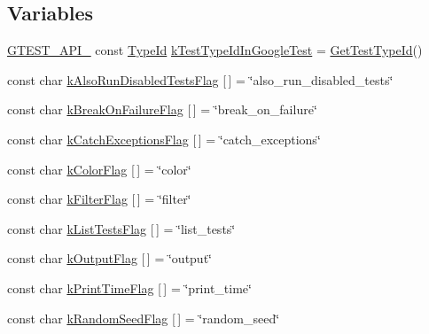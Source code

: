 \subsection*{\-Variables}
\begin{DoxyCompactItemize}
\item 
\hyperlink{gtest-port_8h_aa73be6f0ba4a7456180a94904ce17790}{\-G\-T\-E\-S\-T\-\_\-\-A\-P\-I\-\_\-} const \hyperlink{namespacetesting_1_1internal_ac8e91f0c6a06c0361dc3152ddfeb2342}{\-Type\-Id} \hyperlink{namespacetesting_1_1internal_a3117ae1f8725f2828385dd7d9fb91ffc}{k\-Test\-Type\-Id\-In\-Google\-Test} = \hyperlink{namespacetesting_1_1internal_a3e7f71e983859c908bae4ec8d593ff58}{\-Get\-Test\-Type\-Id}()
\item 
const char \hyperlink{namespacetesting_1_1internal_a6ede7eecc363c348aba14d8b41f73b8f}{k\-Also\-Run\-Disabled\-Tests\-Flag} \mbox{[}$\,$\mbox{]} = \char`\"{}also\-\_\-run\-\_\-disabled\-\_\-tests\char`\"{}
\item 
const char \hyperlink{namespacetesting_1_1internal_a7428ba6fee0b44acbd1d308cd7804beb}{k\-Break\-On\-Failure\-Flag} \mbox{[}$\,$\mbox{]} = \char`\"{}break\-\_\-on\-\_\-failure\char`\"{}
\item 
const char \hyperlink{namespacetesting_1_1internal_a1a9e7362cafa5838b6cae9fb1a861ada}{k\-Catch\-Exceptions\-Flag} \mbox{[}$\,$\mbox{]} = \char`\"{}catch\-\_\-exceptions\char`\"{}
\item 
const char \hyperlink{namespacetesting_1_1internal_a0794d62b77bae59a9082ba4b7ea1fc90}{k\-Color\-Flag} \mbox{[}$\,$\mbox{]} = \char`\"{}color\char`\"{}
\item 
const char \hyperlink{namespacetesting_1_1internal_ae8ede5b14ce6f96fff7e0aabe86aceef}{k\-Filter\-Flag} \mbox{[}$\,$\mbox{]} = \char`\"{}filter\char`\"{}
\item 
const char \hyperlink{namespacetesting_1_1internal_ae3a6eeb3de16a5f69f3bc0568c8e9da0}{k\-List\-Tests\-Flag} \mbox{[}$\,$\mbox{]} = \char`\"{}list\-\_\-tests\char`\"{}
\item 
const char \hyperlink{namespacetesting_1_1internal_add148191334fbc797c9a2cc2fff82670}{k\-Output\-Flag} \mbox{[}$\,$\mbox{]} = \char`\"{}output\char`\"{}
\item 
const char \hyperlink{namespacetesting_1_1internal_a75c069f656d8436272be49ad7024bb1b}{k\-Print\-Time\-Flag} \mbox{[}$\,$\mbox{]} = \char`\"{}print\-\_\-time\char`\"{}
\item 
const char \hyperlink{namespacetesting_1_1internal_aa59cb88e76f5f3649a22dd1c32666671}{k\-Random\-Seed\-Flag} \mbox{[}$\,$\mbox{]} = \char`\"{}random\-\_\-seed\char`\"{}

\end{DoxyCompactItemize}
